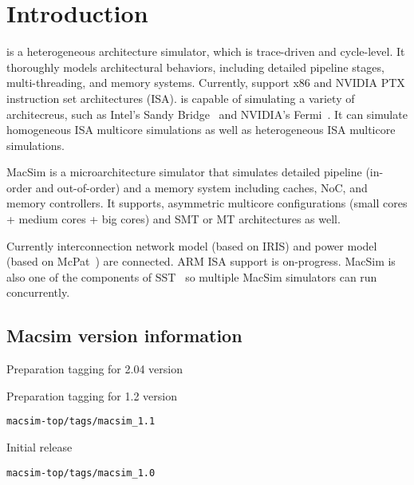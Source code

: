


\chapter{Introduction}


\SIM is a heterogeneous architecture simulator, which is trace-driven
and cycle-level. It thoroughly models architectural behaviors,
including detailed pipeline stages, multi-threading, and memory
systems. Currently, \SIM support x86 and NVIDIA PTX instruction set
architectures (ISA). \SIM is capable of simulating a variety of
architecreus, such as Intel's Sandy Bridge~\cite{sandybridge} and
NVIDIA's Fermi~\cite{fermi}.  It can simulate homogeneous ISA
multicore simulations as well as heterogeneous ISA multicore
simulations.

MacSim is a microarchitecture simulator that simulates detailed
pipeline (in-order and out-of-order) and a memory system including
caches, NoC, and memory controllers. It supports, asymmetric multicore
configurations (small cores + medium cores + big cores) and SMT or MT
architectures as well.

Currently interconnection network model (based on IRIS) and power
model (based on McPat~\cite{mcpat}) are connected. ARM ISA support is
on-progress. MacSim is also one of the components of SST~\cite{sst} so
multiple MacSim simulators can run concurrently.





\section*{Macsim version information}


\begingroup
\renewcommand\descriptionlabel[1]{\textit{\hspace\labelsep{#1}}}
\begin{description}\firmlist
\item[2.03 - May, 2004] Preparation tagging for 2.04 version 
\item[1.1 - September 26, 2012] Preparation tagging for 1.2 version 

  \Verb+macsim-top/tags/macsim_1.1+ 

\item[1.0 - February, 2012] Initial release

  \Verb+macsim-top/tags/macsim_1.0+ 
\end{description}
\endgroup
















